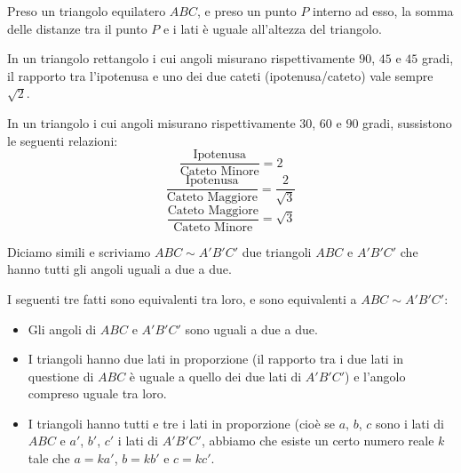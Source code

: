\documentclass[11pt]{scrartcl}
\begin{document}
	\begin{theorem}[Viviani]
		Preso un triangolo equilatero $ABC$, e preso un punto $P$ interno ad esso, la somma delle distanze tra il punto $P$ e i lati è uguale all'altezza del triangolo.
	\end{theorem}
	\begin{theorem}[Triangolo da $45$-$45$]
		In un triangolo rettangolo i cui angoli misurano rispettivamente $90$, $45$ e $45$ gradi, il rapporto tra l'ipotenusa e uno dei due cateti (ipotenusa/cateto) vale sempre $\sqrt{2}$.
	\end{theorem}
	\begin{theorem}[Triangolo da $30$-$60$]
		In un triangolo i cui angoli misurano rispettivamente $30$, $60$ e $90$ gradi, sussistono le seguenti relazioni:
		$$\frac{\text{Ipotenusa}}{\text{Cateto Minore}}=2$$
		$$\frac{\text{Ipotenusa}}{\text{Cateto Maggiore}}=\frac{2}{\sqrt{3}}$$
		$$\frac{\text{Cateto Maggiore}}{\text{Cateto Minore}}=\sqrt{3}$$
	\end{theorem}
	\begin{definition}[Similitudine]
		Diciamo simili e scriviamo $ABC \sim A'B'C'$ due triangoli $ABC$ e $A'B'C'$ che hanno tutti gli angoli uguali a due a due.
	\end{definition}
	\begin{theorem}
		I seguenti tre fatti sono equivalenti tra loro, e sono equivalenti a $ABC \sim A'B'C'$:
		\begin{itemize}
			\item Gli angoli di $ABC$ e $A'B'C'$ sono uguali a due a due.
			\item I triangoli hanno due lati in proporzione (il rapporto tra i due lati in questione di $ABC$ è uguale a quello dei due lati di $A'B'C'$) e l'angolo compreso uguale tra loro.
			\item I triangoli hanno tutti e tre i lati in proporzione (cioè se $a$, $b$, $c$ sono i lati di $ABC$ e $a'$, $b'$, $c'$ i lati di $A'B'C'$, abbiamo che esiste un certo numero reale $k$ tale che $a=ka'$, $b=kb'$ e $c=kc'$.
		\end{itemize}
	\end{theorem}
\end{document}
